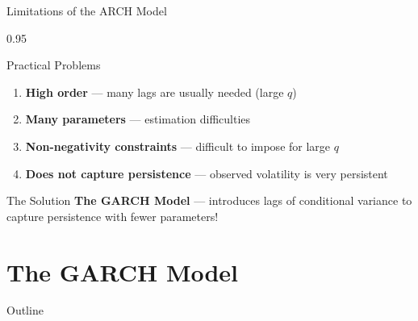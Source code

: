 \documentclass[9pt, aspectratio=169, t]{beamer}
\begin{document}
\begin{frame}{Limitations of the ARCH Model}
    \begin{cminipage}{0.95\textwidth}
    \begin{alertblock}{Practical Problems}
        \begin{enumerate}\setlength{\itemsep}{0pt}
            \item \textbf{High order} --- many lags are usually needed (large $q$)
            \item \textbf{Many parameters} --- estimation difficulties
            \item \textbf{Non-negativity constraints} --- difficult to impose for large $q$
            \item \textbf{Does not capture persistence} --- observed volatility is very persistent
        \end{enumerate}
    \end{alertblock}

    \vspace{0.5cm}

    \begin{block}{The Solution}
        \textbf{The GARCH Model} --- introduces lags of conditional variance to capture persistence with fewer parameters!
    \end{block}
    \end{cminipage}
\end{frame}

\section{The GARCH Model}

\begin{frame}{Outline}
    \small
    \vspace{-0.2cm}
    \tableofcontents[currentsection]
\end{frame}
\end{document}
